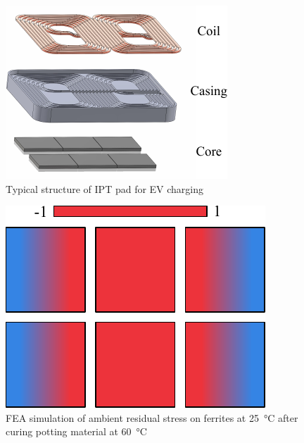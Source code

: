 \documentclass[conference]{IEEEtran}
\begin{document}
\begin{figure}[t]
  \centering
  \includegraphics{figures/padstructure.pdf}
  \caption{Typical structure of IPT pad for EV charging}
  \label{fig:padstructure}
\end{figure}
\begin{figure}[t]
  \centering
  \includegraphics{figures/simulatedpottingpadstresses.pdf}
  \caption{FEA simulation of ambient residual stress on ferrites at \SI{25}{\celsius} after curing potting material at \SI{60}{\celsius}}
  \label{fig:pottingstresses}
\end{figure}
\end{document}
